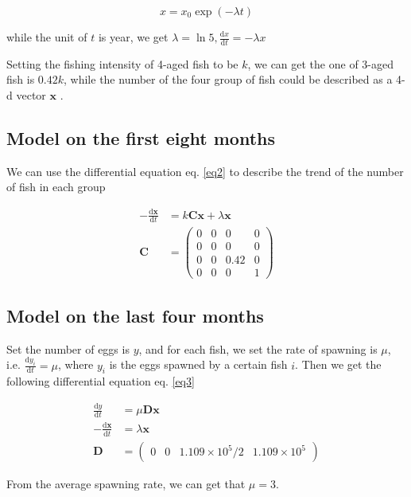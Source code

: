\documentclass{IEEEtran}
\begin{document}
\begin{equation}
    \label{eq1}
    x = x_0 \exp(-\lambda t)
\end{equation}

while the unit of $t$ is year, we get $\lambda = \ln 5, \frac{\mathrm dx}{\mathrm dt} = -\lambda x$

Setting the fishing intensity of 4-aged fish to be $k$, we can get the one of 3-aged fish is $0.42k$, while the number of the four group of fish could be described as a 4-d vector $\bm x$ .

\subsection{Model on the first eight months}

We can use the differential equation eq. \ref{eq2} to describe the trend of the number of fish in each group

\begin{align}
    \label{eq2}
    -\frac{\mathrm d \bm x}{\mathrm d t} &= k \pmb C \bm x + \lambda \bm x \\
    \pmb C &= \begin{pmatrix}0&0&0&0\\0&0&0&0\\0&0&0.42&0\\0&0&0&1\end{pmatrix}
\end{align}
\subsection{Model on the last four months}
Set the number of eggs is $y$, and for each fish, we set the rate of spawning is $\mu$, i.e. $\frac {\mathrm d y_i}{\mathrm d t} = \mu$, where $y_i$ is the eggs spawned by a certain fish $i$. Then we get the following differential equation eq. \ref{eq3}

\begin{align}
    \label{eq3}
    \frac {\mathrm d y}{\mathrm d t} &= \mu \pmb D \bm x\\
    -\frac{\mathrm d \bm x}{\mathrm d t} &=\lambda \bm x\\
    \pmb D &= \begin{pmatrix} 0 & 0 & 1.109\times10^5/2&1.109\times10^5\end{pmatrix}
\end{align}

From the average spawning rate, we can get that $\mu = 3$.
\end{document}
